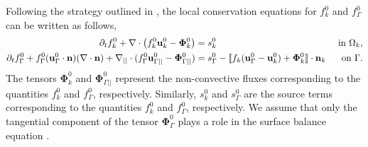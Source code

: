 Following the strategy outlined in \citep{e2001mechanical,ishii2010thermo,bothe2022sharp}, the local conservation equations for $f_k^0$ and $f_\Gamma^0$ can be written as follows,
\begin{align}
    \label{eq:dt_f_k}
    \pddt f_k^0
    +\div \left(
        f_k^0\textbf{u}_k^0
        - \mathbf{\Phi}_k^0
        \right)
    &= 
    s_k^0
    & \text{ in } \Omega_k,&\\
    \pddt f_\Gamma^0 
    + f_\Gamma^0 (\textbf{u}_\Gamma^0 \cdot \textbf{n})(\div \textbf{n})
    +\divI
    (f_\Gamma^0 \textbf{u}_{\Gamma||}^0
        - \mathbf{\Phi}_{\Gamma||}^0 )
    &= 
    s_\Gamma^0
    - \Jump{
       f_k (\textbf{u}_\Gamma^0 - \textbf{u}_k^0)
       + \mathbf{\Phi}_k^0
    } 
    & \text{ on } \Gamma.&
    \label{eq:dt_f_I}
\end{align}
The tensors $\mathbf{\Phi}_k^0$ and $\mathbf{\Phi}_{\Gamma||}^0$ represent the non-convective fluxes corresponding to the quantities $f_k^0$ and $f_\Gamma^0$, respectively. Similarly, $s_k^0$ and $s_\Gamma^0$ are the source terms corresponding to the quantities $f_k^0$ and $f_\Gamma^0$, respectively. We assume that only the tangential component of the tensor $\mathbf{\Phi}_{\Gamma}^0$ plays a role in the surface balance equation \citep{bothe2022sharp}. 
